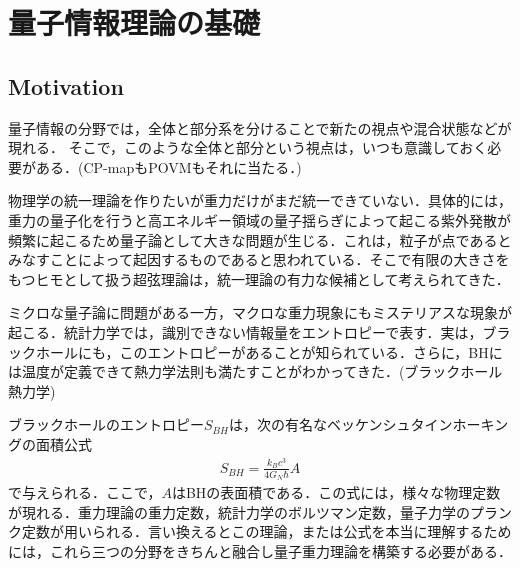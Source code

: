 \chapter{量子情報理論の基礎}

\section{Motivation}
量子情報の分野では，全体と部分系を分けることで新たの視点や混合状態などが現れる．
そこで，このような全体と部分という視点は，いつも意識しておく必要がある．(CP-mapもPOVMもそれに当たる．)

物理学の統一理論を作りたいが重力だけがまだ統一できていない．具体的には，重力の量子化を行うと高エネルギー領域の量子揺らぎによって起こる紫外発散が頻繁に起こるため量子論として大きな問題が生じる．これは，粒子が点であるとみなすことによって起因するものであると思われている．そこで有限の大きさをもつヒモとして扱う超弦理論は，統一理論の有力な候補として考えられてきた．

ミクロな量子論に問題がある一方，マクロな重力現象にもミステリアスな現象が起こる．統計力学では，識別できない情報量をエントロピーで表す．実は，ブラックホールにも，このエントロピーがあることが知られている．さらに，BHには温度が定義できて熱力学法則も満たすことがわかってきた．(ブラックホール熱力学)

ブラックホールのエントロピー$S_{BH}$は，次の有名なベッケンシュタインホーキングの面積公式
\begin{align}
  S_{BH}=\frac{k_{B}c^3}{4G_{N}\hbar}A
\end{align}
で与えられる．ここで，$A$はBHの表面積である．この式には，様々な物理定数が現れる．重力理論の重力定数，統計力学のボルツマン定数，量子力学のプランク定数が用いられる．言い換えるとこの理論，または公式を本当に理解するためには，これら三つの分野をきちんと融合し量子重力理論を構築する必要がある．

